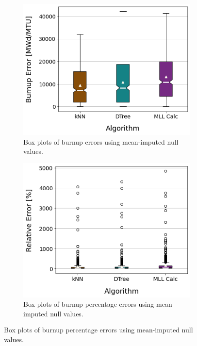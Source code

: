 \begin{figure}[!htb]
  \centering
  \begin{subfigure}[b]{0.49\textwidth}
    \centering
    \includegraphics[width=\textwidth]{./chapters/exp1/sfcompo_boxplots_impnull_burn.png}
    \caption{Box plots of burnup errors using mean-imputed null values.}
    \label{fig:burnimp}
  \end{subfigure}
  \hfill
  \begin{subfigure}[b]{0.49\textwidth}
    \centering
    \includegraphics[width=\textwidth]{./chapters/exp1/sfcompo_boxplots_impnull_pcterr_burn.png}
    \caption{Box plots of burnup percentage errors using mean-imputed null values.}

\end{subfigure}
\end{figure}
